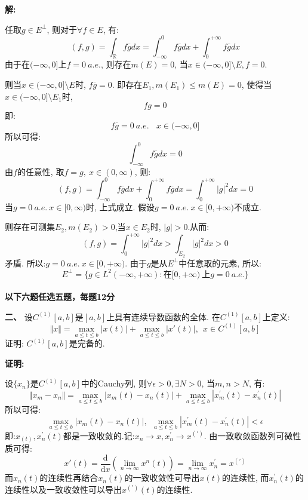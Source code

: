 \documentclass{article}
\begin{document}
\textbf{解:}

任取$g \in E^{\perp}$, 则对于$\forall f \in E$, 有:
$$ (f, g) = \int_{\mathbb{R}} f \overline{g} dx = \int_{-\infty}^0 f \overline{g}dx + \int_{0}^{+\infty} f\overline{g}dx $$
由于在$(-\infty, 0]$上$f = 0\ a.e. $, 则存在$m(E)=0$, 当$x \in (-\infty, 0] \setminus E, f=0$. 

则当$x \in (-\infty, 0] \setminus E$时, $f\overline{g} =0$. 即存在$E_1, m(E_1) \leq m(E) =0$, 使得当$x \in (-\infty, 0] \setminus E_1$时, 
$$fg=0$$
 即: 
$$   f\overline{g} = 0\ a.e. \ \ \ \ x\in (-\infty, 0]$$
所以可得:
$$ \int_{-\infty}^0 f\overline{g} dx = 0 $$
由$f$的任意性, 取$f = g, \ x \in (0, \infty)$, 则:
$$ (f,g) =\int_{-\infty}^0 f \overline{g}dx + \int_{0}^{+\infty} f\overline{g}dx = \int_{0}^{+\infty} |g|^2 dx = 0  $$
当$g = 0 \ a.e. \ x \in [0, \infty)$时, 上式成立. 假设$ g = 0 \ a.e. \ x \in [0, +\infty)$不成立. 

则存在可测集$E_2, m(E_2) >0$,当$x \in E_2$时, $|g| >0$.从而:
$$ (f, g)= \int_{0}^{+\infty} |g|^2 dx > \int_{E_2} |g|^2 dx>0$$
矛盾. 所以:$g=0 \ a.e. \ x \in [0, +\infty)$. 由于$g$是从$E^{\perp}$中任意取的元素, 所以:
$$ E^{\perp} = \{ g \in L^2(-\infty, +\infty): \text{在}[0,+\infty) \ \text{上} g=0 \  a.e. \} $$ \\ 

\textbf{以下六题任选五题，每题12分}

\textbf{二、} 设$C^{(1)}[a,b]$是$[a,b]$上具有连续导数函数的全体. 在$C^{(1)}[a, b]$上定义:
$$ \Vert{x}\Vert = \max\limits_{a \leq t \leq b} |x(t)| + \max\limits_{a \leq t \leq b}|x'(t)|, \ \ x \in C^{(1)}[a, b]  $$
\hspace{2em} 证明: $C^{(1)}[a, b]$是完备的.  

\textbf{证明:}

设$\{x_n \}$是$C^{(1)}[a, b]$中的Cauchy列, 则$\forall \epsilon >0, \exists N>0$, 当$m,n >N$, 有:
$$ \Vert x_m - x_n \Vert = \max\limits_{a \leq t \leq b} |x_m(t) - x_n(t)| + \max\limits_{a \leq t \leq b}|x_m^{'}(t) - x_n^{'}(t)| $$
所以可得:
$$ \max\limits_{a \leq t \leq b} |x_m(t) - x_n(t)|, \ \  \max\limits_{a \leq t \leq b}|x_m^{'}(t) - x_n^{'}(t)| < \epsilon $$
即:$x_(t), x_n^{'}(t)$都是一致收敛的.记:$x_n \rightarrow x, x_n^{'} \rightarrow x^{(')}$. 由一致收敛函数列可微性质可得:
$$ x'(t) = \dfrac{\text{d}}{\text{d}x} (\lim\limits_{n \rightarrow \infty} x^{n}(t)) = \lim\limits_{n \rightarrow \infty} x_n^{'} = x^{(')}  $$
而$x_n(t)$的连续性再结合$x_n(t)$的一致收敛性可导出$x(t)$的连续性, 而$x_n^{'}(t)$的连续性以及一致收敛性可以导出$x^{(')}(t)$的连续性.
\end{document}
